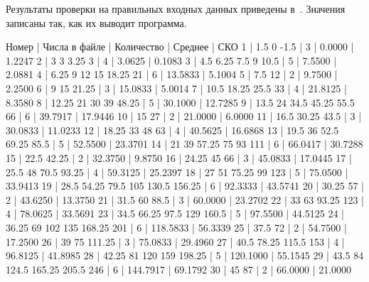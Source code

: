 \documentclass[a4paper,14pt]{extarticle}
\begin{document}

Результаты проверки на правильных входных данных приведены
в~. Значения записаны так, как их выводит программа.

Номер | Числа в файле                    | Количество | Среднее  | СКО
1     | 1.5 0 -1.5                       | 3          | 0.0000   | 1.2247
2     | 3 3 3.25 3                       | 4          | 3.0625   | 0.1083
3     | 4.5 6.25 7.5 9 10.5              | 5          | 7.5500   | 2.0881
4     | 6.25 9 12 15 18.25 21            | 6          | 13.5833  | 5.1004
5     | 7.5 12                           | 2          | 9.7500   | 2.2500
6     | 9 15 21.25                       | 3          | 15.0833  | 5.0014
7     | 10.5 18.25 25.5 33               | 4          | 21.8125  | 8.3580
8     | 12.25 21 30 39 48.25             | 5          | 30.1000  | 12.7285
9     | 13.5 24 34.5 45.25 55.5 66       | 6          | 39.7917  | 17.9446
10    | 15 27                            | 2          | 21.0000  | 6.0000
11    | 16.5 30.25 43.5                  | 3          | 30.0833  | 11.0233
12    | 18.25 33 48 63                   | 4          | 40.5625  | 16.6868
13    | 19.5 36 52.5 69.25 85.5          | 5          | 52.5500  | 23.3701
14    | 21 39 57.25 75 93 111            | 6          | 66.0417  | 30.7288
15    | 22.5 42.25                       | 2          | 32.3750  | 9.8750
16    | 24.25 45 66                      | 3          | 45.0833  | 17.0445
17    | 25.5 48 70.5 93.25               | 4          | 59.3125  | 25.2397
18    | 27 51 75.25 99 123               | 5          | 75.0500  | 33.9413
19    | 28.5 54.25 79.5 105 130.5 156.25 | 6          | 92.3333  | 43.5741
20    | 30.25 57                         | 2          | 43.6250  | 13.3750
21    | 31.5 60 88.5                     | 3          | 60.0000  | 23.2702
22    | 33 63 93.25 123                  | 4          | 78.0625  | 33.5691
23    | 34.5 66.25 97.5 129 160.5        | 5          | 97.5500  | 44.5125
24    | 36.25 69 102 135 168.25 201      | 6          | 118.5833 | 56.3339
25    | 37.5 72                          | 2          | 54.7500  | 17.2500
26    | 39 75 111.25                     | 3          | 75.0833  | 29.4960
27    | 40.5 78.25 115.5 153             | 4          | 96.8125  | 41.8985
28    | 42.25 81 120 159 198.25          | 5          | 120.1000 | 55.1545
29    | 43.5 84 124.5 165.25 205.5 246   | 6          | 144.7917 | 69.1792
30    | 45 87                            | 2          | 66.0000  | 21.0000
\end{document}
